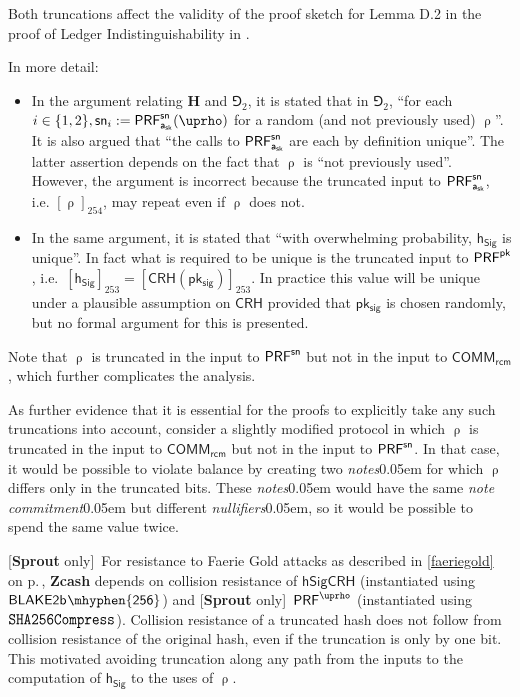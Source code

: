 \documentclass{article}
\renewcommand{\emph}[1]{\hspace{0.15em}{\fontfamily{pnc}\selectfont\scalebox{1.02}[0.999]{\textit{#1}}}\hspace{0.02em}}
\let\oldmathtt\mathtt
\renewcommand{\mathtt}[1]{\scalebox{1.02}[1.07]{$\oldmathtt{#1}$}}
\newcommand{\crossref}[1]{\autoref{#1}\, \emph{`\nameref*{#1}\kern -0.05em'} on p.\,\pageref*{#1}}
\newcommand{\introlist}{\needspace{15ex}}
\newcommand{\sprout}[1]{}
\newcommand{\notsprout}[1]{#1}
\newcommand{\sprout}[1]{#1}
\newcommand{\notsprout}[1]{}
\numberwithin{theorem}{subsection}
\newcommand{\term}[1]{\textsl{#1}\kern 0.05em\xspace}
\newcommand{\termbf}[1]{\textbf{#1}\xspace}
\newcommand{\Zcash}{\termbf{Zcash}}
\newcommand{\Sprout}{\termbf{Sprout}}
\newcommand{\notes}{\term{notes}}
\newcommand{\noteCommitment}{\term{note commitment}}
\newcommand{\nullifiers}{\term{nullifiers}}
\newcommand{\hSigCRH}{\mathsf{hSigCRH}}
\newcommand{\CRH}{\mathsf{CRH}}
\newcommand{\SHA}{\mathtt{SHA256Compress}}
\newcommand{\BlakeTwob}[1]{\mathsf{BLAKE2b\kern 0.05em\mhyphen{#1}}}
\newcommand{\setof}[1]{\{{#1}\}}
\newcommand{\AuthPrivate}{\mathsf{a_{sk}}}
\newcommand{\PRF}[2]{\mathsf{{PRF}^{#2}_\mathnormal{#1}}}
\newcommand{\PRFsn}[1]{\PRF{#1}{sn}}
\newcommand{\PRFpk}[1]{\PRF{#1}{pk}}
\newcommand{\PRFrho}[1]{\PRF{#1}{\NoteAddressRand}}
\newcommand{\CommitAlg}{\mathsf{COMM}}
\newcommand{\Commit}[1]{\CommitAlg_{#1}}
\newcommand{\NoteCommitRand}{\mathsf{\sprout{r}\notsprout{rcm}}}
\newcommand{\NoteAddressRand}{\mathsf{\uprho}}
\newcommand{\pksig}{\mathsf{pk_{sig}}}
\newcommand{\hSig}{\mathsf{h_{Sig}}}
\newcommand{\sproutonly}[1]{\notsprout{[\Sprout only]\,} {#1}}
\begin{document}
Both truncations affect the validity of the proof sketch for Lemma D.2 in
the proof of Ledger Indistinguishability in \cite[Appendix D]{BCG+2014}.

\introlist
In more detail:

\begin{itemize}
  \item In the argument relating $\mathbf{H}$ and $\Game_2$, it is stated that in $\Game_2$,
        ``for each $i \in \setof{1, 2}, \mathsf{sn}_i := \PRFsn{\AuthPrivate}(\NoteAddressRand)$
        for a random (and not previously used) $\NoteAddressRand$''. It is also
        argued that ``the calls to $\PRFsn{\AuthPrivate}$ are each by definition unique''.
        The latter assertion depends on the fact that $\NoteAddressRand$
        is ``not previously used''. However, the argument is incorrect
        because the truncated input to $\PRFsn{\AuthPrivate}$, i.e.
        $[\NoteAddressRand]_{254}$, may repeat even if $\NoteAddressRand$ does not.
  \item In the same argument, it is stated that ``with overwhelming probability,
        $\hSig$ is unique''. In fact what is required to be unique is the
        truncated input to $\PRFpk{}$, i.e.\ $[\hSig]_{253} = [\CRH(\pksig)]_{253}$.
        In practice this value will be unique under a plausible assumption on
        $\CRH$ provided that $\pksig$ is chosen randomly, but no formal argument
        for this is presented.
\end{itemize}

Note that $\NoteAddressRand$ is truncated in the input to $\PRFsn{}$
but not in the input to $\Commit{\NoteCommitRand}$, which further
complicates the analysis.

As further evidence that it is essential for the proofs to explicitly take any
such truncations into account, consider a slightly modified protocol in which
$\NoteAddressRand$ is truncated in the input to $\Commit{\NoteCommitRand}$
but not in the input to $\PRFsn{}$. In that case, it would be possible to
violate balance by creating two \notes for which $\NoteAddressRand$ differs
only in the truncated bits. These \notes would have the same \noteCommitment
but different \nullifiers, so it would be possible to spend the same value
twice.

\sproutonly{
For resistance to Faerie Gold attacks as described in
\crossref{faeriegold}, \Zcash depends on collision resistance of
$\hSigCRH$ (instantiated using $\BlakeTwob{256}$) and \sproutonly{$\PRFrho{}$
(instantiated using $\SHA$)}. Collision resistance of a truncated hash
does not follow from collision resistance of the original hash, even if the
truncation is only by one bit. This motivated avoiding truncation along any
path from the inputs to the computation of $\hSig$ to the uses of
$\NoteAddressRand$.
}
\end{document}
